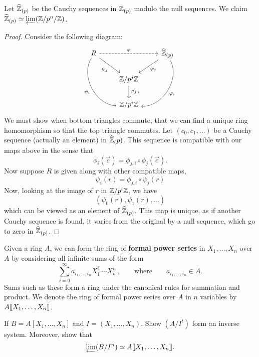 \documentclass{ximera}
\begin{document}
\begin{example}
  Let $\widehat{\mathbb Z}_{(p)}$ be the Cauchy sequences in $\mathbb Z_{(p)}$ modulo the
  null sequences. We claim $\widehat{\mathbb Z}_{(p)}\simeq\varprojlim(\mathbb Z/p^n/\mathbb Z)$.
  \begin{proof}
    Consider the following diagram:
    \[
    \begin{tikzcd}
      R\ar[ddr,bend right=60,swap,"\psi_i"] \ar[dr,swap,"\psi_j"]  \ar[dashed,rr,"\ph"] &   &  \hat{\Z}_{(p)} \ar[ddl,bend left=60,"\ph_i"] \ar[dl,"\ph_j"]\\
      & \Z/p^j\Z \ar[d,"\ph_{j,i}"] &\\
      & \Z/p^i\Z&
    \end{tikzcd}
    \]
    We must show when bottom triangles commute, that we can find a
    unique ring homomorphism so that the top triangle commutes. Let
    $(c_0,c_1,\dots)$ be a Cauchy sequence (actually an element) in
    $\widehat{\mathbb Z}_(p)$. This sequence is compatible with our maps above in
    the sense that
    \[
    \phi_i(\vec{c}) = \phi_{j,i} \circ \phi_j(\vec{c}).
    \]
    Now suppose $R$ is given along with other compatible maps,
    \[
    \psi_i(r) = \phi_{j,i}\circ \psi_j(r)
    \]
    Now, looking at the image of $r$ in $\mathbb Z/p^i\mathbb Z$, we have
    \[
    (\psi_0(r), \psi_1(r),\dots)
    \]
    which can be viewed as an element of $\widehat{\mathbb Z}_{(p)}$. This map is
    unique, as if another Cauchy sequence is found, it varies from the
    original by a null sequence, which go to zero in $\widehat{\mathbb Z}_{(p)}$.
  \end{proof}
\end{example}

\begin{definition}
  Given a ring $A$, we can form the ring of \textbf{formal power
    series} in $X_1,\dots,X_n$ over $A$ by considering all infinite
  sums of the form
  \[
  \sum_{i=0}^\infty a_{i_1,\dots, i_n}X_1^{i_1}\cdots
  X_n^{i_n},\qquad\text{where} \qquad a_{i_1,\dots, i_n}\in A.
  \]
  Sums such as these form a ring under the canonical rules for
  summation and product. We denote the ring of formal power series
  over $A$ in $n$ variables by $A[\hspace{-0.25ex}[ X_1,\dots,X_n]\hspace{-0.25ex}]$.
\end{definition}

\begin{exercise}
  If $B = A[X_1,\dots,X_n]$ and $I = (X_1,\dots,X_n)$. Show $(A/I^t)$
  form an inverse system. Moreover, show that
  \[
  \varprojlim(B/I^n) \simeq A[\hspace{-0.25ex}[ X_1,\dots,X_n]\hspace{-0.25ex}].
  \]
\end{exercise}
\end{document}
